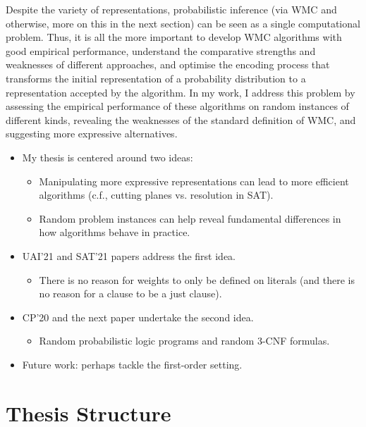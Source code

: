 Despite the variety of representations, probabilistic inference (via WMC and
otherwise, more on this in the next section) can be seen as a single
computational problem. Thus, it is all the more important to develop WMC
algorithms with good empirical performance, understand the comparative strengths
and weaknesses of different approaches, and optimise the encoding process that
transforms the initial representation of a probability distribution to a
representation accepted by the algorithm. In my work, I address this problem by
assessing the empirical performance of these algorithms on random instances of
different kinds, revealing the weaknesses of the standard definition of WMC, and
suggesting more expressive alternatives.

\begin{itemize}
\item My thesis is centered around two ideas:
  \begin{itemize}
  \item Manipulating more expressive representations can lead to more
    efficient algorithms (c.f., cutting planes vs. resolution in SAT).
  \item Random problem instances can help reveal fundamental differences in
    how algorithms behave in practice.
  \end{itemize}
\item UAI'21 and SAT'21 papers address the first idea.
  \begin{itemize}
  \item There is no reason for weights to only be defined on literals (and
    there is no reason for a clause to be a just clause).
  \end{itemize}
\item CP'20 and the next paper undertake the second idea.
  \begin{itemize}
  \item Random probabilistic logic programs and random 3-CNF formulas.
  \end{itemize}
\item Future work: perhaps tackle the first-order setting.
\end{itemize}

\section{Thesis Structure} %

